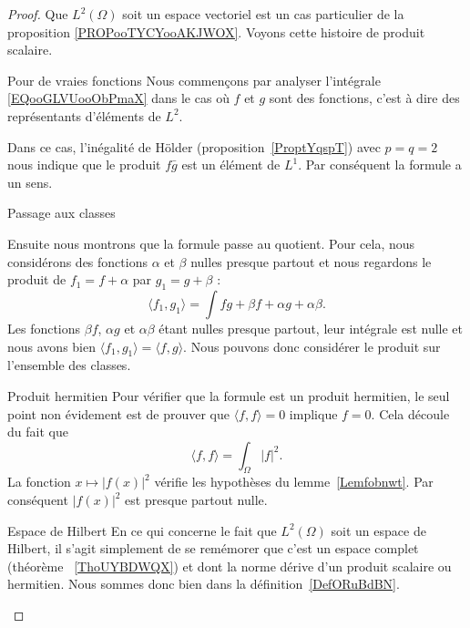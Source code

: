 \begin{proof}
    Que \( L^2(\Omega)\) soit un espace vectoriel est un cas particulier de la proposition \ref{PROPooTYCYooAKJWOX}. Voyons cette histoire de produit scalaire.

    \begin{subproof}
        \item[Pour de vraies fonctions]
            Nous commençons par analyser l'intégrale \eqref{EQooGLVUooObPmaX} dans le cas où \( f\) et \( g\) sont des fonctions, c'est à dire des représentants d'éléments de \( L^2\).

            Dans ce cas, l'inégalité de Hölder (proposition~\ref{ProptYqspT}) avec \( p=q=2\) nous indique que le produit \( f\bar g\) est un élément de \( L^1\). Par conséquent la formule a un sens.

        \item[Passage aux classes]

            Ensuite nous montrons que la formule passe au quotient. Pour cela, nous considérons des fonctions \( \alpha\) et \( \beta\) nulles presque partout et nous regardons le produit de \( f_1=f+\alpha\) par \( g_1=g+\beta\) :
            \begin{equation}
                \langle f_1, g_1\rangle =\int fg+\beta f+\alpha g+ \alpha\beta.
            \end{equation}
            Les fonctions \( \beta f\), \( \alpha g\) et \( \alpha\beta\) étant nulles presque partout, leur intégrale est nulle et nous avons bien \( \langle f_1, g_1\rangle =\langle f,g \rangle \). Nous pouvons donc considérer le produit sur l'ensemble des classes.

        \item[Produit hermitien]
            Pour vérifier que la formule est un produit hermitien, le seul point non évidement est de prouver que \( \langle f, f\rangle =0\) implique \( f=0\). Cela découle du fait que
            \begin{equation}
                \langle f, f\rangle =\int_{\Omega}| f |^2.
            \end{equation}
            La fonction \( x\mapsto | f(x) |^2\) vérifie les hypothèses du lemme~\ref{Lemfobnwt}. Par conséquent \( | f(x) |^2\) est presque partout nulle.

        \item[Espace de Hilbert]
            En ce qui concerne le fait que \( L^2(\Omega)\) soit un espace de Hilbert, il s'agit simplement de se remémorer que c'est un espace complet (théorème ~\ref{ThoUYBDWQX}) et dont la norme dérive d'un produit scalaire ou hermitien. Nous sommes donc bien dans la définition~\ref{DefORuBdBN}.
    \end{subproof}
\end{proof}

